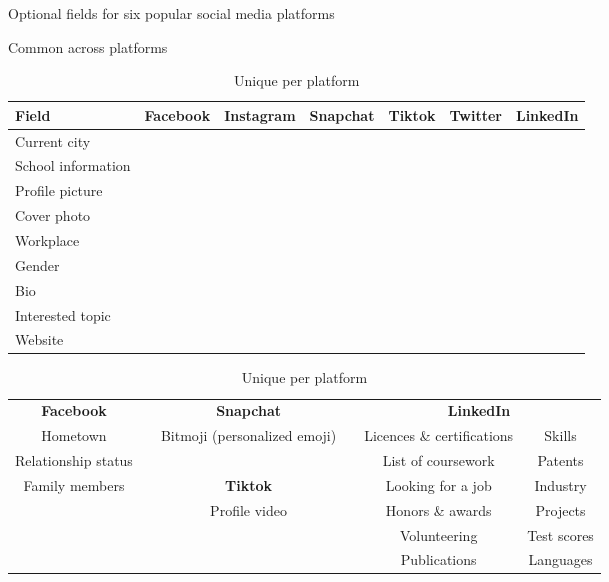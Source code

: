 \documentclass[11pt]{article} %
\newcommand{\cmark}{\ding{51}}%
\begin{document}
\begin{table}[tb]
\small
    \caption{Optional fields for six popular social media platforms}
    \label{tab:optional}
    \begin{subtable}{\textwidth}
        \centering
        \caption{Common across platforms}
        \label{tab:optional-a}
            \begin{tabular}{lcccccc} 
            \toprule
Field &   Facebook &   Instagram &   Snapchat &   Tiktok &   Twitter &   LinkedIn \\ \midrule    
Current city       & \cmark &        &  &        & \cmark & \cmark \\ \hline 
School information & \cmark &        &  &        & \cmark & \cmark \\ \hline 
Profile picture    & \cmark & \cmark &  & \cmark & \cmark & \cmark \\ \hline
Cover photo        & \cmark &        &  &        & \cmark & \cmark \\ \hline
Workplace          & \cmark &        &  &        &        & \cmark \\ \hline
Gender             & \cmark & \cmark &  &        &        &        \\ \hline
Bio                & \cmark & \cmark &  &        & \cmark & \cmark \\ \hline
Interested topic   &        &        &  &        & \cmark & \cmark \\ \hline
Website            & \cmark &        &  &        & \cmark &       \\ \bottomrule
            \end{tabular} 
    \end{subtable}%
    \vspace{1em}
    \begin{subtable}{\textwidth}
        \centering
        \caption{Unique per platform}
        \label{tab:optional-b}
                             
\begin{tabular}{clclcc}
\textbf{Facebook}   &  & \textbf{Snapchat}            &  & \multicolumn{2}{c}{\textbf{LinkedIn}}    \\ \cline{1-1} \cline{3-3} \cline{5-6} 
Hometown            &  & Bitmoji (personalized emoji) &  & Licences \& certifications & Skills      \\
Relationship status &  &                              &  & List of coursework         & Patents     \\
Family members      &  & \textbf{Tiktok}              &  & Looking for a job          & Industry    \\ \cline{3-3}
                    &  & Profile video                &  & Honors \& awards           & Projects    \\
                    &  &                              &  & Volunteering               & Test scores \\
                    &  &                              &  & Publications               & Languages  
        \end{tabular} 
    \end{subtable}
\end{table}
\end{document}
